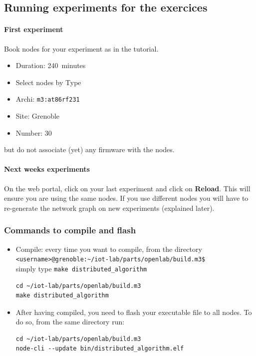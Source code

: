 \documentclass{article}
\begin{document}
\subsection{Running experiments for the exercices}

\paragraph{First experiment} Book nodes for your experiment as in the tutorial.
\begin{itemize}
\item Duration: 240~minutes
\item Select nodes by Type
\item Archi: \texttt{m3:at86rf231}
\item Site: Grenoble
\item Number: $30$
\end{itemize}
but do not associate (yet) any firmware with the nodes.

\paragraph{Next weeks experiments} On the web portal, click on your last
experiment and click on \textbf{Reload}. This will ensure you are using the
same nodes. If you use different nodes you will have to re-generate the network
graph on new experiments (explained later).

\subsubsection{Commands to compile and flash}

\begin{itemize}

\item Compile: every time you want to compile, from the directory\\
    \verb=<username>@grenoble:~/iot-lab/parts/openlab/build.m3$=\\
    simply type \verb=make distributed_algorithm=

    \begin{verbatim}cd ~/iot-lab/parts/openlab/build.m3
make distributed_algorithm\end{verbatim}

\item After having compiled, you need to flash your executable file to all nodes.
    To do so, from the same directory run:
    \begin{verbatim}cd ~/iot-lab/parts/openlab/build.m3
node-cli --update bin/distributed_algorithm.elf\end{verbatim}
\end{itemize}
\end{document}
